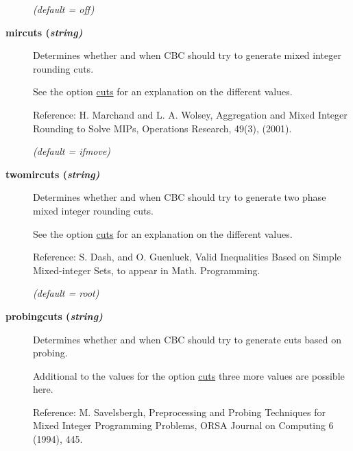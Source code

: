\begin{description}
\textsl{(default = off)}

\item[\label{mircuts}\hypertarget{mircuts}
{\textbf{mircuts (\slshape{string})}}]\hspace{1.0in}

Determines whether and when CBC should try to generate mixed integer rounding cuts.

See the option \hyperlink{cuts}{cuts} for an explanation on the different values.

Reference: H. Marchand and L. A. Wolsey, Aggregation and Mixed Integer Rounding to Solve MIPs, Operations Research, 49(3), (2001).

\textsl{(default = ifmove)}

\item[\label{twomircuts}\hypertarget{twomircuts}
{\textbf{twomircuts (\slshape{string})}}]\hspace{1.0in}

Determines whether and when CBC should try to generate two phase mixed integer rounding cuts.

See the option \hyperlink{cuts}{cuts} for an explanation on the different values.

Reference: S. Dash, and O. Guenluek, Valid Inequalities Based on Simple Mixed-integer Sets, to appear in Math. Programming.

\textsl{(default = root)}

\item[\label{probingcuts}\hypertarget{probingcuts}
{\textbf{probingcuts (\slshape{string})}}]\hspace{1.0in}

Determines whether and when CBC should try to generate cuts based on probing.

Additional to the values for the option \hyperlink{cuts}{cuts} three more values are possible here.

Reference: M. Savelsbergh, Preprocessing and Probing Techniques for Mixed Integer Programming Problems, ORSA Journal on Computing 6 (1994), 445.


\end{description}
